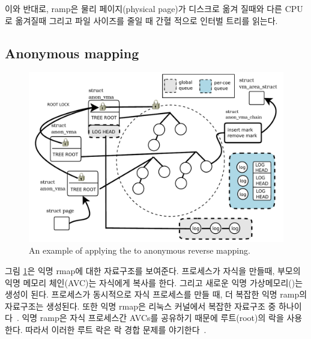 이와 반대로, ramp은 물리 페이지(physical page)가 디스크로 옮겨 질때와 다른 CPU로 옮겨질때 그리고 
파일 사이즈를 줄일 때 간혈 적으로 인터벌 트리를 읽는다.

\subsection{Anonymous mapping}

\begin{figure}[tb]
  \begin{center}
     \includegraphics[width=1\textwidth,height=1\textheight,keepaspectratio]{fig/anon_vma}
  \end{center}
  \caption{An example of applying the \LDU to anonymous reverse mapping.}
  \label{fig:anonvmaramp}
\end{figure}

그림 \ref{fig:anonvmaramp}은 익명 rmap에 대한 자료구조를 보여준다.
프로세스가 자식을 만들때, 부모의 익명 메모리 체인(AVC)는 자식에게 복사를 한다. 
그리고 새로운 익명 가상메모리()는 생성이 된다.
프로세스가 동시적으로 자식 프로세스를 만들 때, 더 복잡한 익명 ramp의 자료구조는 생성된다.
또한 익명 rmap은 리눅스 커널에서 복잡한 자료구조 중 하나이다~\cite{CorbetLWNANON}.
익명 ramp은 자식 프로세스간 AVCs를 공유하기 때문에 루트(root)의 락을 사용한다.
따라서 이러한 루트 락은 락 경합 문제를 야기한다~\cite{Andi2011adding}.  



